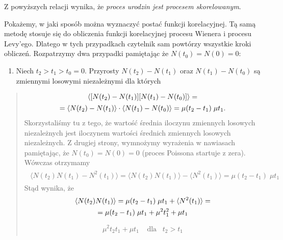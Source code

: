 \documentclass[a4paper,12pt,polish]{sphinxmanual}
\begin{document}
Z powyższych relacji wynika, że \emph{proces urodzin jest procesem skorelowanym}.

Pokażemy, w jaki sposób można wyznaczyć postać funkcji korelacyjnej. Tą samą metodę stosuje się do obliczenia funkcji korelacyjnej procesu Wienera i procesu Levy'ego. Dlatego w tych przypadkach czytelnik sam powtórzy wszystkie kroki obliczeń. Rozpatrzymy dwa przypadki pamiętając że $N(t_0) = N(0) =0$:
\begin{enumerate}
\item {} 
Niech $t_2 > t_1 > t_0=0$. Przyrosty $N(t_2) - N(t_1)$ oraz $N(t_1) - N(t_0)$ są zmiennymi losowymi niezależnymi dla których

\end{enumerate}
\begin{quote}
\label{ch3/chIII021:equation-eqn35}\begin{gather}
\begin{split}\langle[N(t_2) - N(t_1)] [ N(t_1) - N(t_0)] \rangle =\end{split}\label{ch3/chIII021-eqn35}\\\begin{split}= \langle N(t_2) - N(t_1) \rangle \cdot \langle N(t_1) - N(t_0) \rangle = \mu (t_2 -t_1) \; \mu t_1.\end{split}\notag
\end{gather}
Skorzystaliśmy tu z tego, że wartość średnia iloczynu zmiennych losowych niezależnych jest iloczynem wartości średnich zmiennych losowych niezależnych. Z drugiej strony, wymnożymy wyrażenia w nawiasach pamiętając, że $N(t_0) = N(0) = 0$ (proces Poissona startuje z zera). Wówczas otrzymamy
\label{ch3/chIII021:equation-eqn36}\begin{gather}
\begin{split}\langle N(t_2) N(t_1) - N^2(t_1) \rangle = \langle N(t_2) N(t_1) \rangle - \langle N^2(t_1)\rangle =\mu (t_2 -t_1) \; \mu t_1\end{split}\label{ch3/chIII021-eqn36}
\end{gather}
Stąd wynika, że
\label{ch3/chIII021:equation-eqn37}\begin{gather}
\begin{split}\langle N(t_2) N(t_1) \rangle = \mu (t_2 -t_1) \; \mu t_1 +\langle N^2(t_1)\rangle =\end{split}\label{ch3/chIII021-eqn37}\\\begin{split}= \mu (t_2 -t_1) \; \mu t_1 + \mu^2 t_1^2 + \mu t_1\end{split}\notag
\end{gather}\label{ch3/chIII021:equation-eqn38}\begin{gather}
\begin{split}\mu^2 t_2 t_1 + \mu t_1 \; \; \; \; \mbox{dla} \; \; \; t_2 > t_1\end{split}\label{ch3/chIII021-eqn38}
\end{gather}\end{quote}
\end{document}
